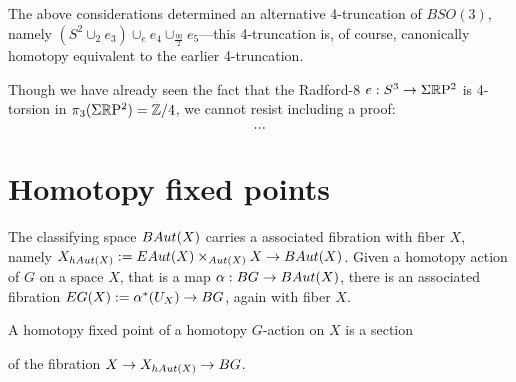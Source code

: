 \documentclass{amsart}
\begin{document}
\begin{remark}
The above considerations determined an alternative 4-truncation of $BSO(3)$, namely $(S^2 \cup_2 e_3) \cup_{e} e_4 \cup_{\frac{\eta q}{2}} e_5$---this 4-truncation is, of course, canonically homotopy equivalent to the earlier 4-truncation.  %
\end{remark}

\begin{remark}
Though we have already seen the fact that the Radford-8 $e: S^3 \rightarrow \Sigma\mathbb R \mathrm{P}^2$ is 4-torsion in $\pi_3(\Sigma \mathbb R \mathrm{P}^2) = \mathbb Z/4$, we cannot resist including a proof: 
\begin{equation} \nonumber
...
\end{equation}
\end{remark}


\section{Homotopy fixed points}


The classifying space $BAut(X)$ carries a associated fibration with fiber $X$, namely $X_{hAut(X)} := EAut(X) \times_{Aut(X)} X \rightarrow BAut(X)$.    Given a homotopy action of $G$ on a space $X$, that is a map $\alpha: BG \rightarrow BAut(X)$, there is an associated fibration $EG(X):=\alpha^\ast(U_X) \rightarrow BG$, again with fiber $X$.

\begin{definition}
A homotopy fixed point of a homotopy $G$-action on $X$ is a section
\begin{center}
\end{center}
of the fibration $X \rightarrow X_{hAut(X)} \rightarrow BG$.
\end{definition}
\end{document}
